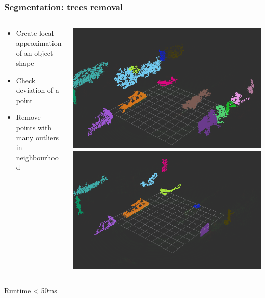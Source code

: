 \documentclass[xcolor=table,usenames,dvipsnames]{beamer}
\begin{document}
\begin{frame}
\frametitle{Segmentation: trees removal}
\begin{columns}
\begin{column}{0.4\textwidth}
\begin{itemize}
\item Create local approximation of an object shape
\item Check deviation of a point
\item Remove points with many outliers in neighbourhood
\end{itemize}
\end{column}
\begin{column}{0.6\textwidth}
\includegraphics[height=0.4\textheight]{img/before_plants_removal.png}
\includegraphics[height=0.4\textheight]{img/plants_removal.png}
\end{column}
\end{columns}
Runtime < 50ms
\end{frame}
\end{document}
